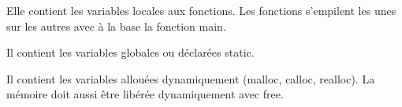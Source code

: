  Elle contient les variables locales aux fonctions. Les fonctions s'empilent les unes sur les autres avec à la base la fonction main.\\

\par

 Il contient les variables globales ou déclarées static. \\

\par

 Il contient les variables allouées dynamiquement (malloc, calloc, realloc). La mémoire doit aussi être libérée dynamiquement avec free.\\

\par

\newpage

